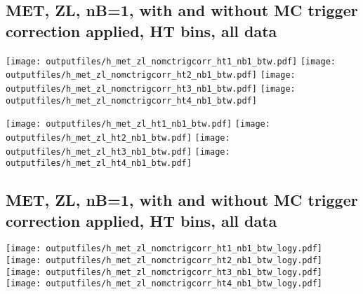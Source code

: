 \documentclass[11pt]{article}
\begin{document}







     \subsection{ MET, ZL, nB=1, with and without MC trigger correction applied, HT bins, all data}

    \noindent
     \texttt{[image: outputfiles/h\_met\_zl\_nomctrigcorr\_ht1\_nb1\_btw.pdf]}
     \texttt{[image: outputfiles/h\_met\_zl\_nomctrigcorr\_ht2\_nb1\_btw.pdf]}
     \texttt{[image: outputfiles/h\_met\_zl\_nomctrigcorr\_ht3\_nb1\_btw.pdf]}
     \texttt{[image: outputfiles/h\_met\_zl\_nomctrigcorr\_ht4\_nb1\_btw.pdf]}

    \noindent
     \texttt{[image: outputfiles/h\_met\_zl\_ht1\_nb1\_btw.pdf]}
     \texttt{[image: outputfiles/h\_met\_zl\_ht2\_nb1\_btw.pdf]}
     \texttt{[image: outputfiles/h\_met\_zl\_ht3\_nb1\_btw.pdf]}
     \texttt{[image: outputfiles/h\_met\_zl\_ht4\_nb1\_btw.pdf]}

    \clearpage
     \subsection{ MET, ZL, nB=1, with and without MC trigger correction applied, HT bins, all data}

    \noindent
     \texttt{[image: outputfiles/h\_met\_zl\_nomctrigcorr\_ht1\_nb1\_btw\_logy.pdf]}
     \texttt{[image: outputfiles/h\_met\_zl\_nomctrigcorr\_ht2\_nb1\_btw\_logy.pdf]}
     \texttt{[image: outputfiles/h\_met\_zl\_nomctrigcorr\_ht3\_nb1\_btw\_logy.pdf]}
     \texttt{[image: outputfiles/h\_met\_zl\_nomctrigcorr\_ht4\_nb1\_btw\_logy.pdf]}
\end{document}
